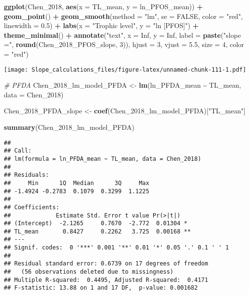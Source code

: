 \documentclass[
]{article}
\newenvironment{Shaded}{\begin{snugshade}}{\end{snugshade}}
\newcommand{\AttributeTok}[1]{\textcolor[rgb]{0.13,0.29,0.53}{#1}}
\newcommand{\CommentTok}[1]{\textcolor[rgb]{0.56,0.35,0.01}{\textit{#1}}}
\newcommand{\ConstantTok}[1]{\textcolor[rgb]{0.56,0.35,0.01}{#1}}
\newcommand{\DecValTok}[1]{\textcolor[rgb]{0.00,0.00,0.81}{#1}}
\newcommand{\FloatTok}[1]{\textcolor[rgb]{0.00,0.00,0.81}{#1}}
\newcommand{\FunctionTok}[1]{\textcolor[rgb]{0.13,0.29,0.53}{\textbf{#1}}}
\newcommand{\NormalTok}[1]{#1}
\newcommand{\OtherTok}[1]{\textcolor[rgb]{0.56,0.35,0.01}{#1}}
\newcommand{\SpecialCharTok}[1]{\textcolor[rgb]{0.81,0.36,0.00}{\textbf{#1}}}
\newcommand{\StringTok}[1]{\textcolor[rgb]{0.31,0.60,0.02}{#1}}
\begin{document}
\begin{Shaded}
\begin{Highlighting}[]
\FunctionTok{ggplot}\NormalTok{(Chen\_2018, }\FunctionTok{aes}\NormalTok{(}\AttributeTok{x =}\NormalTok{ TL\_mean, }\AttributeTok{y =}\NormalTok{ ln\_PFOS\_mean)) }\SpecialCharTok{+}
  \FunctionTok{geom\_point}\NormalTok{() }\SpecialCharTok{+}
  \FunctionTok{geom\_smooth}\NormalTok{(}\AttributeTok{method =} \StringTok{"lm"}\NormalTok{, }\AttributeTok{se =} \ConstantTok{FALSE}\NormalTok{, }\AttributeTok{color =} \StringTok{"red"}\NormalTok{, }\AttributeTok{linewidth =} \FloatTok{0.5}\NormalTok{) }\SpecialCharTok{+}
  \FunctionTok{labs}\NormalTok{(}\AttributeTok{x =} \StringTok{"Trophic level"}\NormalTok{,}
       \AttributeTok{y =} \StringTok{"ln [PFOS]"}\NormalTok{) }\SpecialCharTok{+}
  \FunctionTok{theme\_minimal}\NormalTok{() }\SpecialCharTok{+}
  \FunctionTok{annotate}\NormalTok{(}\StringTok{"text"}\NormalTok{, }\AttributeTok{x =} \ConstantTok{Inf}\NormalTok{, }\AttributeTok{y =} \ConstantTok{Inf}\NormalTok{, }\AttributeTok{label =} \FunctionTok{paste}\NormalTok{(}\StringTok{"slope ="}\NormalTok{, }\FunctionTok{round}\NormalTok{(Chen\_2018\_PFOS\_slope, }\DecValTok{3}\NormalTok{)), }
           \AttributeTok{hjust =} \DecValTok{3}\NormalTok{, }\AttributeTok{vjust =} \FloatTok{5.5}\NormalTok{, }\AttributeTok{size =} \DecValTok{4}\NormalTok{, }\AttributeTok{color =} \StringTok{"red"}\NormalTok{)}
\end{Highlighting}
\end{Shaded}

\texttt{[image: Slope\_calculations\_files/figure-latex/unnamed-chunk-111-1.pdf]}

\begin{Shaded}
\begin{Highlighting}[]
\CommentTok{\# PFDA}
\NormalTok{Chen\_2018\_lm\_model\_PFDA }\OtherTok{\textless{}{-}} \FunctionTok{lm}\NormalTok{(ln\_PFDA\_mean }\SpecialCharTok{\textasciitilde{}}\NormalTok{ TL\_mean,}
                             \AttributeTok{data =}\NormalTok{ Chen\_2018)}

\NormalTok{Chen\_2018\_PFDA\_slope }\OtherTok{\textless{}{-}} \FunctionTok{coef}\NormalTok{(Chen\_2018\_lm\_model\_PFDA)[}\StringTok{"TL\_mean"}\NormalTok{]}

\FunctionTok{summary}\NormalTok{(Chen\_2018\_lm\_model\_PFDA)}
\end{Highlighting}
\end{Shaded}

\begin{verbatim}
## 
## Call:
## lm(formula = ln_PFDA_mean ~ TL_mean, data = Chen_2018)
## 
## Residuals:
##     Min      1Q  Median      3Q     Max 
## -1.4924 -0.2783  0.1079  0.3299  1.1225 
## 
## Coefficients:
##             Estimate Std. Error t value Pr(>|t|)   
## (Intercept)  -2.1265     0.7670  -2.772  0.01304 * 
## TL_mean       0.8427     0.2262   3.725  0.00168 **
## ---
## Signif. codes:  0 '***' 0.001 '**' 0.01 '*' 0.05 '.' 0.1 ' ' 1
## 
## Residual standard error: 0.6739 on 17 degrees of freedom
##   (56 observations deleted due to missingness)
## Multiple R-squared:  0.4495, Adjusted R-squared:  0.4171 
## F-statistic: 13.88 on 1 and 17 DF,  p-value: 0.001682
\end{verbatim}
\end{document}
